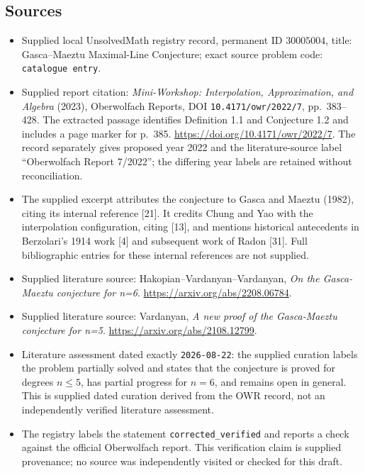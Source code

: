 \documentclass[11pt]{article}
\begin{document}
\subsection{Sources}
\begin{itemize}
\item Supplied local UnsolvedMath registry record, permanent ID \(30005004\), title: Gasca--Maeztu Maximal-Line Conjecture; exact source problem code: \texttt{catalogue entry}.
\item Supplied report citation: \emph{Mini-Workshop: Interpolation, Approximation, and Algebra} (2023), Oberwolfach Reports, DOI \texttt{10.4171/owr/2022/7}, pp.\ 383--428. The extracted passage identifies Definition 1.1 and Conjecture 1.2 and includes a page marker for p.\ 385. \url{https://doi.org/10.4171/owr/2022/7}. The record separately gives proposed year 2022 and the literature-source label ``Oberwolfach Report 7/2022''; the differing year labels are retained without reconciliation.
\item The supplied excerpt attributes the conjecture to Gasca and Maeztu (1982), citing its internal reference [21]. It credits Chung and Yao with the interpolation configuration, citing [13], and mentions historical antecedents in Berzolari's 1914 work [4] and subsequent work of Radon [31]. Full bibliographic entries for these internal references are not supplied.
\item Supplied literature source: Hakopian--Vardanyan--Vardanyan, \emph{On the Gasca-Maeztu conjecture for n=6}. \url{https://arxiv.org/abs/2208.06784}.
\item Supplied literature source: Vardanyan, \emph{A new proof of the Gasca-Maeztu conjecture for n=5}. \url{https://arxiv.org/abs/2108.12799}.
\item Literature assessment dated exactly \texttt{2026-08-22}: the supplied curation labels the problem partially solved and states that the conjecture is proved for degrees \(n\leq5\), has partial progress for \(n=6\), and remains open in general. This is supplied dated curation derived from the OWR record, not an independently verified literature assessment.
\item The registry labels the statement \texttt{corrected\_verified} and reports a check against the official Oberwolfach report. This verification claim is supplied provenance; no source was independently visited or checked for this draft.
\end{itemize}
\end{document}
